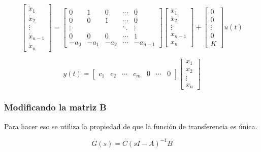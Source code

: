 \documentclass[legalpaper,twocolumn]{article}
\begin{document}
\[
    \begin{bmatrix}
        \dot{x}_1     \\
        \dot{x}_2     \\
        \vdots        \\
        \dot{x}_{n-1} \\
        \dot{x}_n
    \end{bmatrix} =
    \begin{bmatrix}
        0      & 1    & 0    & \cdots & 0        \\
        0      & 0    & 1    & \cdots & 0        \\
        \vdots &      &      & \ddots & \vdots   \\
        0      & 0    & 0    & \cdots & 1        \\
        -a_0   & -a_1 & -a_2 & \cdots & -a_{n-1}
    \end{bmatrix}
    \begin{bmatrix}
        x_1     \\
        x_2     \\
        \vdots  \\
        x_{n-1} \\
        x_n
    \end{bmatrix} +
    \begin{bmatrix}
        0      \\
        0      \\
        \vdots \\
        0      \\
        K
    \end{bmatrix} u(t)
\]

\[
    y(t) =
    \begin{bmatrix}
        c_1 & c_2 & \cdots & c_m & 0 & \cdots & 0
    \end{bmatrix}
    \begin{bmatrix}
        x_1    \\
        x_2    \\
        \vdots \\
        x_n
    \end{bmatrix}
\]
\subsubsection{Modificando la matriz B}
Para hacer eso se utiliza la propiedad de que la función de transferencia es única.

\[ G(s) = C (sI - A)^{-1} B \]
\end{document}
